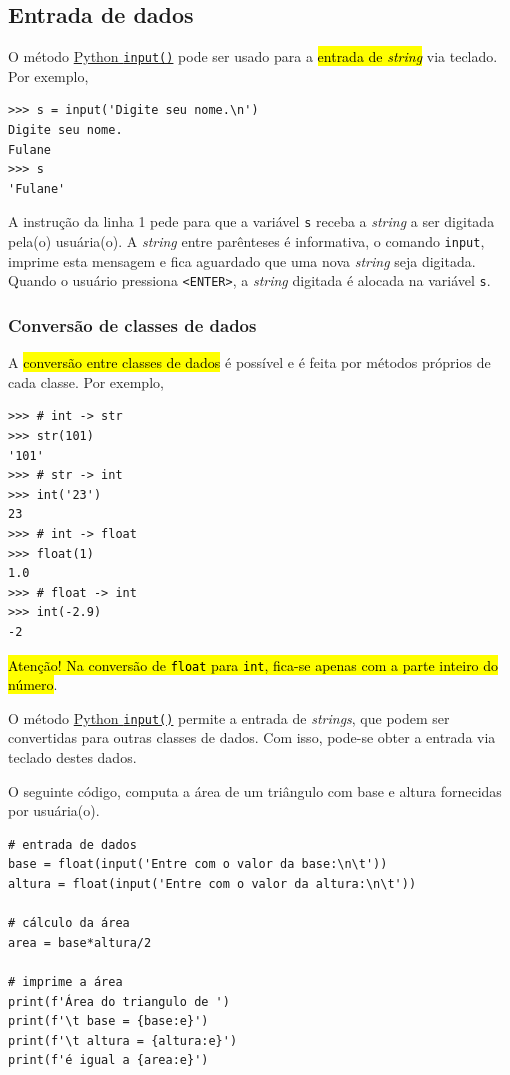 \subsection{Entrada de dados}

O método \href{https://docs.python.org/3/library/functions.html}{Python \lstinline+input()+} pode ser usado para a \hl{entrada de \textit{string}} via teclado. Por exemplo,
\begin{lstlisting}
>>> s = input('Digite seu nome.\n')
Digite seu nome.
Fulane
>>> s
'Fulane'
\end{lstlisting}
A instrução da linha 1 pede para que a variável \lstinline+s+ receba a \textit{string} a ser digitada pela(o) usuária(o). A \textit{string} entre parênteses é informativa, o comando \lstinline+input+, imprime esta mensagem e fica aguardado que uma nova \textit{string} seja digitada. Quando o usuário pressiona \lstinline+<ENTER>+, a \textit{string} digitada é alocada na variável \lstinline+s+.

\subsubsection{Conversão de classes de dados}

A \hl{conversão entre classes de dados} é possível e é feita por métodos próprios de cada classe. Por exemplo,
\begin{lstlisting}
>>> # int -> str
>>> str(101)
'101'
>>> # str -> int
>>> int('23')
23
>>> # int -> float
>>> float(1)
1.0
>>> # float -> int
>>> int(-2.9)
-2
\end{lstlisting}
\hl{Atenção! Na conversão de {\lstinline+float+} para {\lstinline+int+}, fica-se apenas com a parte inteiro do número}.

\begin{obs}
  O método \href{https://docs.python.org/3/library/functions.html}{Python \lstinline+input()+} permite a entrada de \textit{strings}, que podem ser convertidas para outras classes de dados. Com isso, pode-se obter a entrada via teclado destes dados.
\end{obs}

\begin{ex}
  O seguinte código, computa a área de um triângulo com base e altura fornecidas por usuária(o).
\begin{lstlisting}
# entrada de dados
base = float(input('Entre com o valor da base:\n\t'))
altura = float(input('Entre com o valor da altura:\n\t'))

# cálculo da área
area = base*altura/2

# imprime a área
print(f'Área do triangulo de ')
print(f'\t base = {base:e}')
print(f'\t altura = {altura:e}')
print(f'é igual a {area:e}')
\end{lstlisting}
\end{ex}

